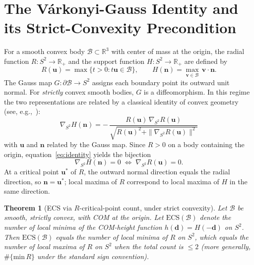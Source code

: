 \documentclass[11pt,a4paper]{article}
\newtheorem{theorem}{Theorem}
\begin{document}
\section{The V\'arkonyi-Gauss Identity and its Strict-Convexity Precondition}
\label{sec:varkonyi_identity}

For a smooth convex body $\mathcal{B} \subset \mathbb{R}^3$ with
center of mass at the origin, the radial function $R: S^2 \to \mathbb{R}_+$
and the support function $H: S^2 \to \mathbb{R}_+$ are defined by
\begin{equation}
R(\mathbf{u}) = \max\{t > 0 : t\mathbf{u} \in \mathcal{B}\},
\qquad
H(\mathbf{n}) = \max_{\mathbf{v} \in \mathcal{B}}\, \mathbf{v}\cdot\mathbf{n}.
\label{eq:R_H_def}
\end{equation}
The Gauss map $G: \partial\mathcal{B} \to S^2$ assigns each boundary
point its outward unit normal. For \emph{strictly} convex smooth
bodies, $G$ is a diffeomorphism. In this regime the two
representations are related by a classical identity of convex
geometry (see, e.g.,~\cite[\S 1.7]{schneider2014}):
\begin{equation}
\nabla_{S^2} H(\mathbf{n})
  = -\,\frac{R(\mathbf{u})\,\nabla_{S^2} R(\mathbf{u})}
           {\sqrt{R(\mathbf{u})^2 + \|\nabla_{S^2} R(\mathbf{u})\|^2}}
\label{eq:identity}
\end{equation}
with $\mathbf{u}$ and $\mathbf{n}$ related by the Gauss map. Since
$R > 0$ on a body containing the origin, equation~\eqref{eq:identity}
yields the bijection
\begin{equation}
\nabla_{S^2} H(\mathbf{n}) = 0
  \;\Longleftrightarrow\;
  \nabla_{S^2} R(\mathbf{u}) = 0.
\label{eq:identity_bijection}
\end{equation}
At a critical point $\mathbf{u}^*$ of $R$, the outward normal
direction equals the radial direction, so $\mathbf{n} = \mathbf{u}^*$;
local maxima of $R$ correspond to local maxima of $H$ in the same
direction.

\begin{theorem}[ECS via $R$-critical-point count, under strict convexity]
\label{thm:ecs_via_R}
Let $\mathcal{B}$ be smooth, strictly convex, with COM at the origin.
Let $\mathrm{ECS}(\mathcal{B})$ denote the number of local minima of
the COM-height function $h(\mathbf{d}) = H(-\mathbf{d})$ on $S^2$.
Then $\mathrm{ECS}(\mathcal{B})$ equals the number of local minima of
$R$ on $S^2$, which equals the number of local maxima of $R$ on $S^2$
when the total count is $\le 2$ (more generally, $\#\{\mathrm{min}\,R\}$
under the standard sign convention).
\end{theorem}
\end{document}
